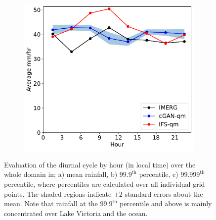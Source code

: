 \documentclass{article}
\begin{document}
\begin{figure}[t]
     \begin{subfigure}[t]{0.32\textwidth}
     \includegraphics[width=\textwidth]{images/diurnal_cycle_quantile_99999_final-nologs_217600.pdf}
     \caption{}
     \end{subfigure}
     \caption{Evaluation of the diurnal cycle by hour (in local time) over the whole domain in; a) mean rainfall, b) $99.9^{\text{th}}$ percentile, c) $99.999^{\text{th}}$ percentile, where percentiles are calculated over all individual grid points. The shaded regions indicate $\pm2$ standard errors about the mean. Note that rainfall at the $99.9^{\text{th}}$ percentile and above is mainly concentrated over Lake Victoria and the ocean.}
     \label{fig:diurnal}
\end{figure}
\end{document}
